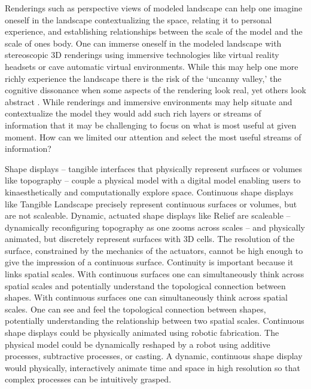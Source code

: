 \documentclass{article}
\begin{document}
Renderings such as perspective views of modeled landscape 
can help one imagine oneself in the landscape 
contextualizing the space,
relating it to personal experience,
and establishing relationships between the scale of the model and the scale of ones body. 
%
One can immerse oneself in the modeled landscape 
with stereoscopic 3D renderings 
using immersive technologies like virtual reality headsets 
or cave automatic virtual environments. 
%
While this may help one more richly experience the landscape
there is the risk of the `uncanny valley,' the cognitive dissonance 
when some aspects of the rendering look real, yet others look abstract \citep{Cafaro2014}. 
%
While renderings and immersive environments may help situate and contextualize the model
they would add such rich layers or streams of information 
that it may be challenging to focus on what is most useful at given moment. 
How can we limited our attention and select the most useful streams of information?

Shape displays -- tangible interfaces that physically represent surfaces or volumes like topography -- 
couple a physical model with a digital model
enabling users to kinaesthetically and computationally explore space. 
%
Continuous shape displays like Tangible Landscape precisely represent continuous surfaces or volumes, 
but are not scaleable. 
%
Dynamic, actuated shape displays like Relief \citep{Leithinger2010} are scaleable 
-- dynamically reconfiguring topography as one zooms across scales -- and physically animated, but discretely represent surfaces with 3D cells. The resolution of the surface, constrained by the mechanics of the actuators, cannot be high enough to give the impression of a continuous surface. 
%
Continuity is important because it links spatial scales. 
%
With continuous surfaces one can simultaneously think across spatial scales and potentially understand the topological connection between shapes.
%
With continuous surfaces one can simultaneously think across spatial scales.
One can see and feel the topological connection between shapes, 
potentially understanding the relationship between two spatial scales.
%
Continuous shape displays could be physically animated using robotic fabrication. 
The physical model could be dynamically reshaped by a robot 
using additive processes, subtractive processes, or casting. 
%
A dynamic, continuous shape display 
would physically, interactively animate time and space
in high resolution
so that complex processes can be intuitively grasped.
%








 
\end{document}
